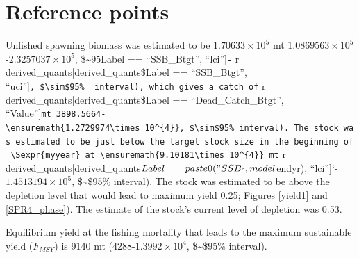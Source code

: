 \documentclass[11pt,
  english,
  a4paper,
]{article}
\begin{document}
\leavevmode\tagmcend\tagstructend\par


\hypertarget{reference-points-1}{%
\section{Reference points}\label{reference-points-1}}

\leavevmode\tagmcend\tagstructend


Unfished spawning biomass was estimated to be \ensuremath{1.70633\times 10^{5}} mt \ensuremath{1.0869563\times 10^{5}}-\ensuremath{2.3257037\times 10^{5}}, \$\sim{\(95%
\)\leavevmode\tagmcend\tagstructend}Label == ``SSB\_Btgt'', ``lci''{]}\texttt{-} r derived\_quants{[}derived\_quants\$Label == ``SSB\_Btgt'', ``uci''{]}\texttt{,\ \$\textbackslash{}sim\$95\%\ \ interval),\ which\ gives\ a\ catch\ of} r derived\_quants{[}derived\_quants\$Label == ``Dead\_Catch\_Btgt'', ``Value''{]}\texttt{mt\ 3898.5664-\textbackslash{}ensuremath\{1.2729974\textbackslash{}times\ 10\^{}\{4\}\},\ \$\textbackslash{}sim\$95\%\ interval).\ The\ stock\ was\ estimated\ to\ be\ just\ below\ the\ target\ stock\ size\ in\ the\ beginning\ of\ \textbackslash{}Sexpr\{myyear\}\ at\ \textbackslash{}ensuremath\{9.10181\textbackslash{}times\ 10\^{}\{4\}\}\ mt} r derived\_quants{[}derived\_quants{\(Label == paste0("SSB_", model\)\leavevmode\tagmcend\tagstructend}endyr), ``lci''{]}`-\ensuremath{1.4513194\times 10^{5}}, \$\sim\$95\% interval). The stock was estimated to be above the depletion level that would lead to maximum yield 0.25; Figures \ref{yield1} and \ref{SPR4_phase}). The estimate of the stock's current level of depletion was 0.53.

\leavevmode\tagmcend\tagstructend\par


Equilibrium yield at the fishing mortality that leads to the maximum sustainable yield ({\(F_{MSY}\)\leavevmode\tagmcend\tagstructend}) is 9140 mt (4288-\ensuremath{1.3992\times 10^{4}}, \$\sim\$95\% interval).
\end{document}
